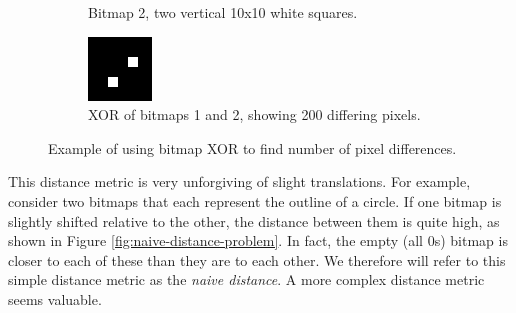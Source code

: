 \documentclass[12pt]{article}
\begin{document}
\begin{figure}
\begin{subfigure}[b]{.3\linewidth}
\caption{Bitmap 2, two vertical 10x10 white squares.}
\label{fig:squares-vertical}
\end{subfigure}
\begin{subfigure}[b]{.3\linewidth}
\includegraphics[width=\linewidth]{squares-diagonal.png}
\caption{XOR of bitmaps 1 and 2, showing 200 differing pixels.}
\label{fig:squares-diagonal}
\end{subfigure}
\caption{Example of using bitmap XOR to find number of pixel differences.}
\label{fig:naive-distance}
\end{figure}

This distance metric is very unforgiving of slight translations.  For example, consider two bitmaps that each represent the outline of a circle.  If one bitmap is slightly shifted relative to the other, the distance between them is quite high, as shown in Figure \ref{fig:naive-distance-problem}.  In fact, the empty (all 0s) bitmap is closer to each of these than they are to each other.  We therefore will refer to this simple distance metric as the \textit{naive distance}. A more complex distance metric seems valuable.
\end{document}
